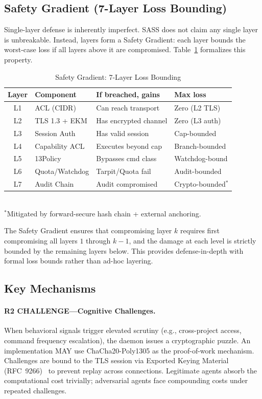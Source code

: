 \documentclass[sigconf,anonymous]{acmart}
\begin{document}
\subsection{Safety Gradient (7-Layer Loss Bounding)}

Single-layer defense is inherently imperfect. SASS does not claim any single layer is unbreakable. Instead, layers form a Safety Gradient: each layer bounds the worst-case loss if all layers above it are compromised. Table~\ref{tab:gradient} formalizes this property.

\begin{table}[t]
\caption{Safety Gradient: 7-Layer Loss Bounding}
\label{tab:gradient}
\small
\begin{tabular}{@{}clll@{}}
\toprule
\textbf{Layer} & \textbf{Component} & \textbf{If breached, gains} & \textbf{Max loss} \\
\midrule
L1 & ACL (CIDR) & Can reach transport & Zero (L2 TLS) \\
L2 & TLS 1.3 + EKM & Has encrypted channel & Zero (L3 auth) \\
L3 & Session Auth & Has valid session & Cap-bounded \\
L4 & Capability ACL & Executes beyond cap & Branch-bounded \\
L5 & 13Policy & Bypasses cmd class & Watchdog-bound \\
L6 & Quota/Watchdog & Tarpit/Quota fail & Audit-bounded \\
L7 & Audit Chain & Audit compromised & Crypto-bounded$^*$ \\
\bottomrule
\end{tabular}
\\[2pt]
{\footnotesize $^*$Mitigated by forward-secure hash chain + external anchoring.}
\end{table}

The Safety Gradient ensures that compromising layer $k$ requires first compromising all layers $1$ through $k-1$, and the damage at each level is strictly bounded by the remaining layers below. This provides defense-in-depth with formal loss bounds rather than ad-hoc layering.

\subsection{Key Mechanisms}

\paragraph{R2 CHALLENGE---Cognitive Challenges.}
When behavioral signals trigger elevated scrutiny (e.g., cross-project access, command frequency escalation), the daemon issues a cryptographic puzzle. An implementation MAY use ChaCha20-Poly1305 as the proof-of-work mechanism. Challenges are bound to the TLS session via Exported Keying Material (RFC~9266)~\cite{rfc9266} to prevent replay across connections. Legitimate agents absorb the computational cost trivially; adversarial agents face compounding costs under repeated challenges.
\end{document}
